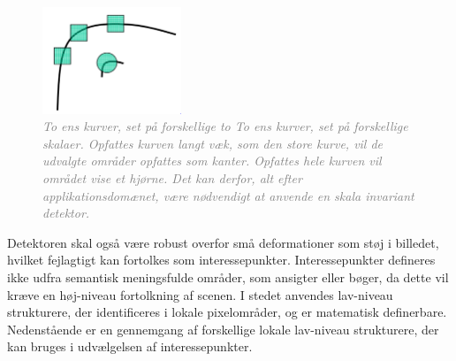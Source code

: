 \begin{figure}[H]
    \centering
    \includegraphics[width=0.37\textwidth]{fig/28.png}
     \vspace{-1em}
    \begin{center}    
       \caption{\textcolor{gray}{\footnotesize \textit{To ens kurver, set på forskellige to To ens kurver, set på forskellige skalaer. Opfattes kurven langt væk, som den store kurve, vil de udvalgte områder opfattes som kanter. Opfattes hele kurven vil området vise et hjørne. Det kan derfor, alt efter applikationsdomænet, være nødvendigt at anvende en skala invariant detektor.}}}
    \label{fig:skal}
     \end{center}
     \vspace{-2.5em}
  \end{figure} \noindent
Detektoren skal også være robust overfor små deformationer som støj i billedet, hvilket fejlagtigt kan fortolkes som interessepunkter. Interessepunkter defineres ikke udfra semantisk meningsfulde områder, som ansigter eller bøger, da dette vil kræve en høj-niveau fortolkning af scenen. I stedet anvendes lav-niveau strukturere, der identificeres i lokale pixelområder, og er matematisk definerbare. Nedenstående er en gennemgang af forskellige lokale lav-niveau strukturere, der kan bruges i udvælgelsen af interessepunkter.


